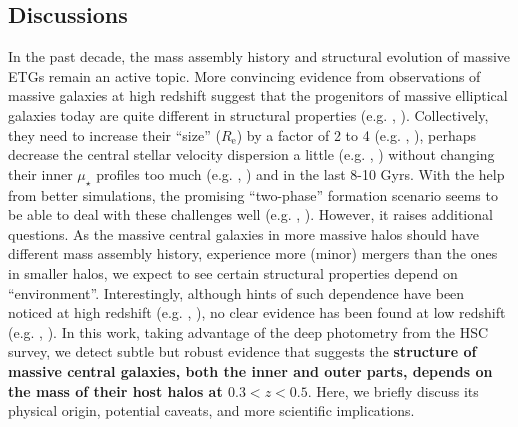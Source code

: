 \documentclass{emulateapj}
\def\mden{{$\mu_{\star}$}}
\newcommand{\update}[1]{\textcolor{Bittersweet}{#1}}
\begin{document}
\begin{CJK*}{UTF8}{gbsn}
\section{Discussions}
    \label{sec:discussion}
    
    \update{
    In the past decade, the mass assembly history and structural evolution of massive 
    ETGs remain an active topic.  
    More convincing evidence from observations of massive galaxies at high redshift 
    suggest that the progenitors of massive elliptical galaxies today are quite different 
    in structural properties (e.g. \citealt{Bezanson2009}, \citealt{vanDokkum2010}).  
    Collectively, they need to increase their ``size'' ($R_{\mathrm{e}}$) by a factor 
    of 2 to 4 (e.g. \citealt{Newman2012}, \citealt{vdWel2014}), perhaps decrease the 
    central stellar velocity dispersion a little (e.g. \citealt{vandeSande2011}, 
    \citealt{Belli2014}) without changing their inner \mden{} profiles too much 
    (e.g. \citealt{Szomoru2012}, \citealt{Patel2013}) and  in the last 8-10 Gyrs.  
    With the help from better simulations, the promising ``two-phase'' formation 
    scenario seems to be able to deal with these challenges well (e.g. 
    \citealt{Oser2010}, \citealt{Oser2012}).
    However, it raises additional questions.
    As the massive central galaxies in more massive halos should have different mass 
    assembly history, experience more (minor) mergers than the ones in smaller halos, 
    we expect to see certain structural properties depend on ``environment''. 
    Interestingly, although hints of such dependence have been noticed at high redshift 
    (e.g. \citealt{Papovich2012}, \citealt{Delaye2014}), no clear evidence has been found 
    at low redshift (e.g. \citealt{Nair2010}, \citealt{HCompany13}). 
    In this work, taking advantage of the deep photometry from the HSC survey, we 
    detect subtle but robust evidence that suggests the \textbf{structure
    of massive central galaxies, both the inner and outer parts, depends on the mass of
    their host halos at $0.3 < z < 0.5$}. 
    Here, we briefly discuss its physical origin, potential caveats, and more scientific 
    implications.  
    }
    

\end{CJK*}
\end{document}
